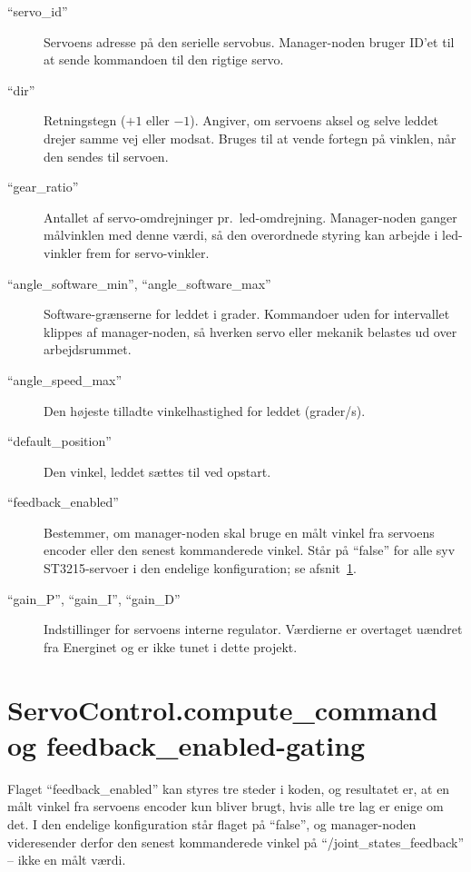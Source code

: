 \begin{description}
    \item[\enquote{servo\_id}] Servoens adresse på den serielle
        servobus. Manager-noden bruger ID'et til at sende
        kommandoen til den rigtige servo.
    \item[\enquote{dir}] Retningstegn ($+1$ eller $-1$). Angiver,
        om servoens aksel og selve leddet drejer samme vej eller
        modsat. Bruges til at vende fortegn på vinklen, når den
        sendes til servoen.
    \item[\enquote{gear\_ratio}] Antallet af servo-omdrejninger
        pr.~led-omdrejning. Manager-noden ganger målvinklen med
        denne værdi, så den overordnede styring kan arbejde i
        led-vinkler frem for servo-vinkler.
    \item[\enquote{angle\_software\_min},
          \enquote{angle\_software\_max}] Software-grænserne for
        leddet i grader. Kommandoer uden for intervallet klippes
        af manager-noden, så hverken servo eller mekanik
        belastes ud over arbejdsrummet.
    \item[\enquote{angle\_speed\_max}] Den højeste tilladte
        vinkelhastighed for leddet (grader/s).
    \item[\enquote{default\_position}] Den vinkel, leddet sættes
        til ved opstart.
    \item[\enquote{feedback\_enabled}] Bestemmer, om manager-noden
        skal bruge en målt vinkel fra servoens encoder eller den
        senest kommanderede vinkel. Står på \enquote{false} for
        alle syv ST3215-servoer i den endelige konfiguration; se
        afsnit~\ref{sec:appB-feedback}.
    \item[\enquote{gain\_P}, \enquote{gain\_I}, \enquote{gain\_D}]
        Indstillinger for servoens interne regulator. Værdierne
        er overtaget uændret fra Energinet og er ikke tunet i
        dette projekt.
\end{description}

\section{ServoControl.compute\_command og feedback\_enabled-gating}
\label{sec:appB-feedback}

Flaget \enquote{feedback\_enabled} kan styres tre steder i
koden, og resultatet er, at en målt vinkel fra servoens encoder
kun bliver brugt, hvis alle tre lag er enige om det. I den
endelige konfiguration står flaget på \enquote{false}, og
manager-noden videresender derfor den senest kommanderede vinkel
på \enquote{/joint\_states\_feedback} -- ikke en målt værdi.

